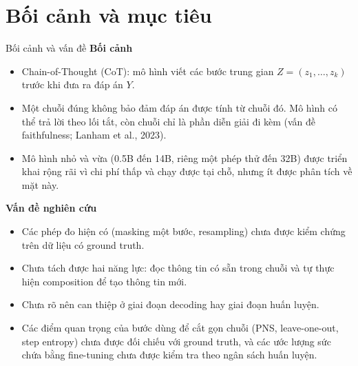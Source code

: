 \documentclass[aspectratio=169,t,10pt]{beamer}
\begin{document}
\section{Bối cảnh và mục tiêu}
\begin{frame}{Bối cảnh và vấn đề}
\textbf{Bối cảnh}
\begin{itemize}
  \item Chain-of-Thought (CoT): mô hình viết các bước trung gian $Z = (z_1, \dots, z_k)$ trước khi đưa ra đáp án $Y$.
  \item Một chuỗi đúng không bảo đảm đáp án được tính từ chuỗi đó. Mô hình có thể trả lời theo lối tắt, còn chuỗi chỉ là phần diễn giải đi kèm (vấn đề faithfulness; Lanham et al., 2023).
  \item Mô hình nhỏ và vừa (0.5B đến 14B, riêng một phép thử đến 32B) được triển khai rộng rãi vì chi phí thấp và chạy được tại chỗ, nhưng ít được phân tích về mặt này.
\end{itemize}
\vspace{4pt}
\textbf{Vấn đề nghiên cứu}
\begin{itemize}
  \item Các phép đo hiện có (masking một bước, resampling) chưa được kiểm chứng trên dữ liệu có ground truth.
  \item Chưa tách được hai năng lực: đọc thông tin có sẵn trong chuỗi và tự thực hiện composition để tạo thông tin mới.
  \item Chưa rõ nên can thiệp ở giai đoạn decoding hay giai đoạn huấn luyện.
  \item Các điểm quan trọng của bước dùng để cắt gọn chuỗi (PNS, leave-one-out, step entropy) chưa được đối chiếu với ground truth, và các ước lượng sức chứa bằng fine-tuning chưa được kiểm tra theo ngân sách huấn luyện.
\end{itemize}
\end{frame}
\end{document}
